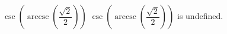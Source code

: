  {$\csc\left(\operatorname{arccsc}\left(\dfrac{\sqrt{2}}{2}\right)\right)$}
{ $\csc\left(\operatorname{arccsc}\left(\dfrac{\sqrt{2}}{2}\right)\right)$ is undefined.}
